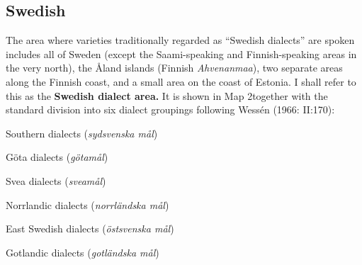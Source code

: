 \subsection{\rmfamily Swedish}
\label{bkm:Ref108607742}
\begin{styleBodyTextFirst}
The area where varieties traditionally regarded as “Swedish dialects” are spoken includes all of Sweden (except the Saami-speaking and Finnish-speaking areas in the very north), the Åland islands (Finnish \textit{Ahvenanmaa}), two separate areas along the Finnish coast, and a small area on the coast of Estonia. I shall refer to this as the \textbf{Swedish dialect area.} It is shown in Map 2together with the standard division into six dialect groupings following Wessén (1966: II:170): 

\end{styleBodyTextFirst}


\begin{listWWNumiiileveli}
\item {}

\begin{styleListii}
Southern dialects (\textit{sydsvenska mål})

\end{styleListii}

\item {}

\begin{styleListii}
Göta dialects (\textit{götamål})

\end{styleListii}

\item {}

\begin{styleListii}
Svea dialects (\textit{sveamål})

\end{styleListii}

\item {}

\begin{styleListii}
Norrlandic dialects (\textit{norrländska mål})

\end{styleListii}

\item {}

\begin{styleListii}
East Swedish dialects (\textit{östsvenska mål})

\end{styleListii}

\item {}

\begin{styleListii}
Gotlandic dialects (\textit{gotländska mål})

\end{styleListii}

\end{listWWNumiiileveli}

